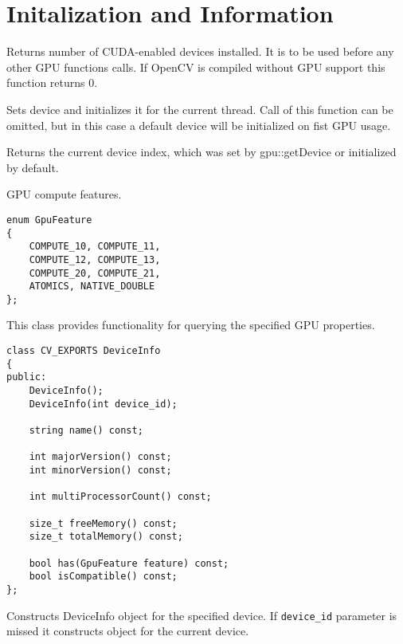 \section{Initalization and Information}


Returns number of CUDA-enabled devices installed. It is to be used before any other GPU functions calls. If OpenCV is compiled without GPU support this function returns 0. 



Sets device and initializes it for the current thread. Call of this function can be omitted, but in this case a default device will be initialized on fist GPU usage.

\begin{description}
\end{description}


Returns the current device index, which was set by {gpu::getDevice} or initialized by default.



\label{cpp.gpu.GpuFeature}
GPU compute features.

\begin{lstlisting}
enum GpuFeature
{
    COMPUTE_10, COMPUTE_11,
    COMPUTE_12, COMPUTE_13,
    COMPUTE_20, COMPUTE_21,
    ATOMICS, NATIVE_DOUBLE
};
\end{lstlisting}


This class provides functionality for querying the specified GPU properties. 

\begin{lstlisting}
class CV_EXPORTS DeviceInfo
{
public:
    DeviceInfo();
    DeviceInfo(int device_id);

    string name() const;

    int majorVersion() const;
    int minorVersion() const;

    int multiProcessorCount() const;

    size_t freeMemory() const;
    size_t totalMemory() const;

    bool has(GpuFeature feature) const;
    bool isCompatible() const;
};
\end{lstlisting}


Constructs DeviceInfo object for the specified device. If \texttt{device\_id} parameter is missed it constructs object for the current device.

